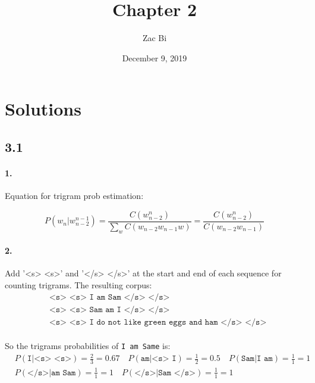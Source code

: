 \documentclass{article}
\begin{document}
\begin{titlepage}
    \title{Chapter 2}
    \author{Zac Bi}
    \date{December 9, 2019}
    \maketitle
    \thispagestyle{empty}
\end{titlepage}


\section*{Solutions}

\subsection*{3.1}
\paragraph{1.}
Equation for trigram prob estimation:

$$P(w_n|w_{n-2}^{n-1}) =  \displaystyle\frac{C(w_{n-2}^{n})}{\sum_{w} C(w_{n-2} w_{n-1} w)} = \displaystyle\frac{C(w_{n-2}^{n})}{C(w_{n-2} w_{n-1})}$$

\paragraph{2.}
Add '<s> <s>' and '</s> </s>' at the start and end  of each sequence for counting trigrams.
The resulting corpus:
\begin{align*}
     & \texttt{<s> <s> I am Sam </s> </s>}                         \\
     & \texttt{<s> <s> Sam am I </s> </s>}                         \\
     & \texttt{<s> <s> I do not like green eggs and ham </s> </s>}
\end{align*}

\paragraph{}
So the trigrams probabilities of \texttt{I am Same} is:
\begin{align*}
     & P(\texttt{I|<s> <s>}) = \frac{2}{3} = 0.67 \quad
    P(\texttt{am|<s> I}) = \frac{1}{2} = 0.5 \quad
    P(\texttt{Sam|I am}) = \frac{1}{1} = 1              \\
     & P(\texttt{</s>|am Sam}) = \frac{1}{1} = 1 \quad
    P(\texttt{</s>|Sam </s>}) = \frac{1}{1} = 1 \quad
\end{align*}
\end{document}
